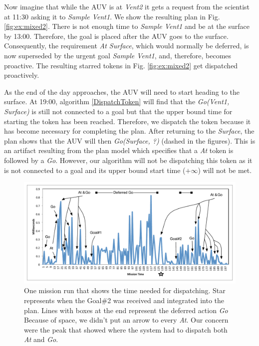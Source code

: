 Now imagine that while the AUV is at {\em Vent2} it gets a request
from the scientist at 11:30 asking it to {\em Sample Vent1}. We show
the resulting plan in Fig. \ref{fig:ex:mixed2}. There is not enough
time to {\em Sample Vent1} and be at the surface by 13:00. Therefore,
the goal is placed after the AUV goes to the surface.  Consequently,
the requirement {\em At Surface}, which would normally be deferred, is
now superseded by the urgent goal {\em Sample Vent1}, and, therefore,
becomes proactive. The resulting starred tokens in
Fig. \ref{fig:ex:mixed2} get dispatched proactively.

As the end of the day approaches, the AUV will need to start heading
to the surface. At 19:00, algorithm \ref{DispatchToken} will find that
the {\em Go(Vent1, Surface)} is still not connected to a goal but that
the upper bound time for starting the token has been
reached. Therefore, we dispatch the token because it has become
necessary for completing the plan.  After returning to the {\em
  Surface}, the plan shows that the AUV will then {\em Go(Surface, ?)}
(dashed in the figures). This is an artifact resulting from the plan
model which specifies that a {\em At} token is followed by a {\em Go}.
However, our algorithm will not be dispatching this token as it is not
connected to a goal and its upper bound start time ($+\infty$) will
not be met.

\begin{figure}[!htbp]
  \centering
  \includegraphics[width=\columnwidth]{figs/example_run.pdf}
  \caption{\small One mission run that shows the time needed for
    dispatching. Star represents when the Goal\#2 was received and
    integrated into the plan. Lines with boxes at the end represent
    the deferred action {\em Go} Because of space, we didn't put an
    arrow to every {\em At}. Our concern were the peak that showed
    where the system had to dispatch both {\em At} and {\em Go}. }
  \label{fig:example_run}
\end{figure}

